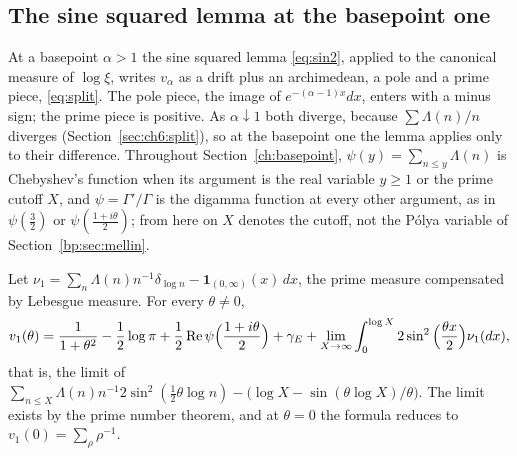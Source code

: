 \subsection{The sine squared lemma at the basepoint one}\label{bp:sec:sin2}

At a basepoint $\alpha>1$ the sine squared lemma \eqref{eq:sin2}, applied to the canonical measure of $\log\xi$, writes $v_\alpha$ as a drift plus an archimedean, a pole and a prime piece, \eqref{eq:split}. The pole piece, the image of $e^{-(\alpha-1)x}dx$, enters with a minus sign; the prime piece is positive. As $\alpha\downarrow1$ both diverge, because $\sum\Lambda(n)/n$ diverges (Section~\ref{sec:ch6:split}), so at the basepoint one the lemma applies only to their difference. Throughout Section~\ref{ch:basepoint}, $\psi(y)=\sum_{n\le y}\Lambda(n)$ is Chebyshev's function when its argument is the real variable $y\ge1$ or the prime cutoff $X$, and $\psi=\Gamma'/\Gamma$ is the digamma function at every other argument, as in $\psi(\frac32)$ or $\psi(\frac{1+i\theta}2)$; from here on $X$ denotes the cutoff, not the P\'olya variable of Section~\ref{bp:sec:mellin}.

\begin{proposition}\label{bp:prop:sin2}
Let $\nu_1=\sum_n\Lambda(n)n^{-1}\delta_{\log n}-\mathbf 1_{(0,\infty)}(x)\,dx$, the prime measure compensated by Lebesgue measure. For every $\theta\ne0$,
\begin{equation}\label{bp:eq:sin2one}
v_1(\theta)=\frac1{1+\theta^2}-\frac12\log\pi+\frac12\operatorname{Re}\psi\Big(\frac{1+i\theta}2\Big)+\gamma_E+\lim_{X\to\infty}\int_0^{\log X}2\sin^2\Big(\frac{\theta x}2\Big)\nu_1(dx),
\end{equation}
that is, the limit of $\sum_{n\le X}\Lambda(n)n^{-1}2\sin^2(\frac12\theta\log n)-\big(\log X-\sin(\theta\log X)/\theta\big)$. The limit exists by the prime number theorem, and at $\theta=0$ the formula reduces to $v_1(0)=\sum_\rho\rho^{-1}$.
\end{proposition}

